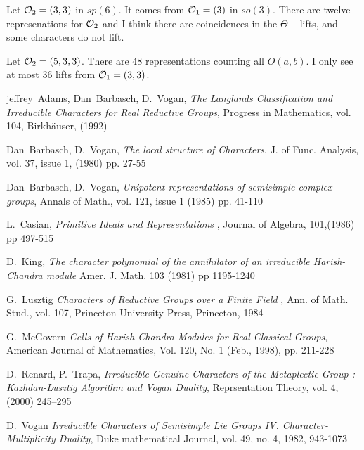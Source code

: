 \documentclass[11pt ,reqno]{amsart}
\begin{document}
\begin{example}
  Let ${\mathcal O}_2=(3,3)$ in $sp(6)$. It comes from ${\mathcal O}_1=(3)$ in
  $so(3)$. There are twelve represenations for ${\mathcal O}_2$ and I think
  there are coincidences in the $\Theta-$lifts, and some characters
  do not lift.
\end{example}
\begin{example}
Let ${\mathcal O}_2=(5,3,3)$. There are $48$ representations counting all
$O(a,b)$. I only see at most $36$ lifts from ${\mathcal O}_1=(3,3)$.    
\end{example}


\newpage


\begin{thebibliography}{99}
jeffrey~Adams,  Dan~Barbasch, D.~Vogan, {\em The Langlands
  Classification and Irreducible Characters for Real Reductive
  Groups},  Progress in Mathematics, vol. 104, Birkh\"auser, (1992)


  
  Dan~Barbasch, D.~Vogan, {\em The local structure of Characters}, J. of Func. Analysis,
  vol. 37, issue 1, (1980) pp. 27-55

  Dan~Barbasch, D.~Vogan, {\em Unipotent representations of semisimple
  complex groups},
  Annals of Math.,
  vol. 121, issue 1 (1985) pp. 41-110
  
  L.~Casian, {\em Primitive Ideals and Representations }, Journal of Algebra, 101,(1986) pp 497-515

  D.~King, {\em The character polynomial of the annihilator of an
    irreducible Harish-Chandra module} Amer. J. Math. 103 (1981) pp 1195-1240

G.~Lusztig {\em Characters of Reductive Groups over a Finite Field} ,
Ann. of Math. Stud., vol. 107, Princeton  University Press, Princeton, 1984

G.~McGovern {\em Cells of Harish-Chandra Modules for Real Classical
  Groups}, American Journal of Mathematics, Vol. 120, No. 1 (Feb.,
1998), pp. 211-228 

D.~Renard, P.~Trapa, {\em Irreducible Genuine Characters of the
  Metaplectic Group : Kazhdan-Lusztig Algorithm and Vogan Duality},
Reprsentation Theory, vol. 4, (2000) 245–295 

  
D.~Vogan {\em  Irreducible Characters of Semisimple Lie Groups
  IV. Character-Multiplicity Duality}, Duke mathematical Journal,
vol. 49, no. 4, 1982, 943-1073

\end{thebibliography}
\end{document}
